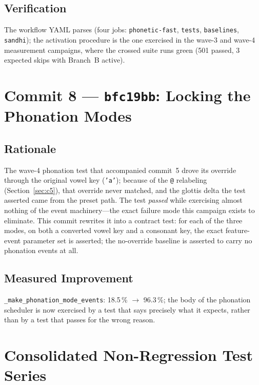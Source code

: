 \documentclass[11pt,a4paper]{article}
\newcommand{\code}[1]{\texttt{#1}}
\newcommand{\commit}[1]{\texttt{#1}}
\newcommand{\pct}[1]{{#1}\,\%}
\begin{document}
\subsection{Verification}

The workflow YAML parses (four jobs:
\code{phonetic-fast}, \code{tests}, \code{baselines}, \code{sandhi});
the activation procedure is the one exercised in the wave-3 and
wave-4 measurement campaigns, where the crossed suite runs green
(501 passed, 3 expected skips with Branch~B active).

\section{Commit 8 --- \commit{bfc19bb}: Locking the Phonation Modes}
\label{sec:c8}

\subsection{Rationale}

The wave-4 phonation test that accompanied commit~5 drove its
override through the original vowel key (\code{'a'}); because of the
\code{@} relabeling (Section~\ref{sec:c5}), that override never
matched, and the glottis delta the test asserted came from the preset
path. The test \emph{passed} while exercising almost nothing of the
event machinery---the exact failure mode this campaign exists to
eliminate. This commit rewrites it into a contract test: for each of
the three modes, on both a converted vowel key and a consonant key,
the exact feature-event parameter set is asserted; the no-override
baseline is asserted to carry no phonation events at all.

\subsection{Measured Improvement}

\code{\_make\_phonation\_mode\_events}: \pct{18.5} $\to$
\pct{96.3}; the body of the phonation scheduler is now exercised by
a test that says precisely what it expects, rather than by a test
that passes for the wrong reason.

\section{Consolidated Non-Regression Test Series}
\label{sec:series}
\end{document}
